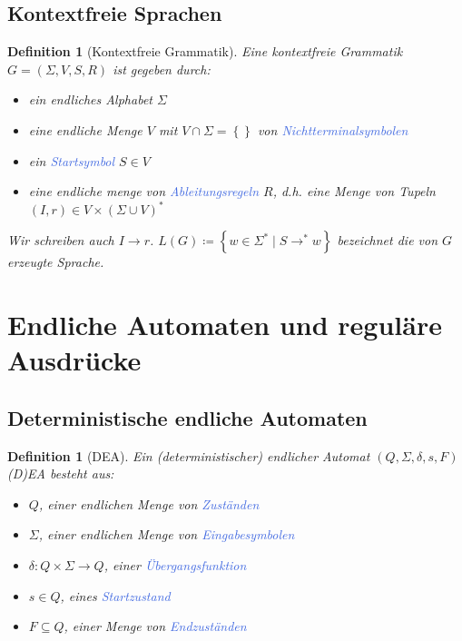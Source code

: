 \documentclass[11pt]{article}
\newcommand{\tcol}[1]{\textcolor{RoyalBlue}{#1}}
\newcommand{\set}[1]{\left\lbrace #1\right\rbrace}
\theoremstyle{break}
\newtheorem{defi}[satz]{Definition}
\begin{document}
\subsection{Kontextfreie Sprachen}

\begin{defi}[Kontextfreie Grammatik]
Eine kontextfreie Grammatik $G=(\Sigma ,V,S,R)$ ist gegeben durch:
\begin{itemize}
\item ein endliches Alphabet $\Sigma$
\item eine endliche Menge $V$ mit $V\cap\Sigma = \set{}$ von \tcol{Nichtterminalsymbolen}
\item ein \tcol{Startsymbol} $S\in V$
\item eine endliche menge von \tcol{Ableitungsregeln} $R$, d.h. eine Menge von Tupeln $(I,r)\in V\times (\Sigma\cup V)^*$
\end{itemize}
Wir schreiben auch $I\rightarrow r$. $L(G)\coloneqq \set{w\in\Sigma^*\mid S\rightarrow^*w}$ bezeichnet die von $G$ erzeugte Sprache.
\end{defi}



\section{Endliche Automaten und reguläre Ausdrücke}


\subsection{Deterministische endliche Automaten}

\begin{defi}[DEA]
Ein (deterministischer) endlicher Automat $(Q,\Sigma ,\delta ,s,F)$ (D)EA besteht aus:
\begin{itemize}
\item $Q$, einer endlichen Menge von \tcol{Zuständen}
\item $\Sigma$, einer endlichen Menge von \tcol{Eingabesymbolen}
\item $\delta\colon Q\times\Sigma\to Q$, einer \tcol{Übergangsfunktion}
\item $s\in Q$, eines \tcol{Startzustand}
\item $F\subseteq Q$, einer Menge von \tcol{Endzuständen}
\end{itemize}
\end{defi}
\end{document}
